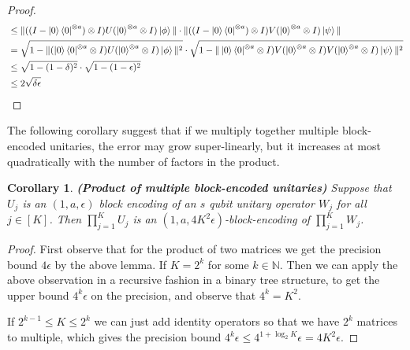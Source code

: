 \documentclass[12pt, oneside]{book}
\newtheorem{corollary}[theorem]{Corollary}
\theoremstyle{definition}
\theoremstyle{definition}
\theoremstyle{remark}
\begin{document}
\begin{proof}
\begin{align*}
    &\leq \|((I-\ket{0}\bra{0}^{\otimes a})\otimes I)U(\ket{0}^{\otimes a}\otimes I)\ket{\phi}\|\cdot \|((I-\ket{0}\bra{0}^{\otimes a})\otimes I)V(\ket{0}^{\otimes a}\otimes I)\ket{\psi}\|\\
    &=\sqrt{1-\|(\ket{0}\bra{0}^{\otimes a}\otimes I)U(\ket{0}^{\otimes a}\otimes I)\ket{\phi}\|^2}\cdot \sqrt{1-\|\ket{0}\bra{0}^{\otimes a}\otimes I)V(\ket{0}^{\otimes a}\otimes I)V(\ket{0}^{\otimes a}\otimes I)\ket{\psi}\|^2}\\
    &\leq \sqrt{1-(1-\delta)^2}\cdot \sqrt{1-(1-\epsilon)^2}\\
    &\leq 2\sqrt{\delta \epsilon}
    \end{align*}
\end{proof}
The following corollary suggest that if we multiply together multiple block-encoded unitaries, the error may grow super-linearly, but it increases at most quadratically with the number of factors in the product.

\begin{corollary}
\textbf{(Product of multiple block-encoded unitaries)} Suppose that $U_j$ is an $(1,a,\epsilon)$ block encoding of an $s$ qubit unitary operator $W_j$ for all $j\in[K]$. Then $\prod_{j=1}^K U_j$ is an $(1,a,4K^2\epsilon)$-block-encoding of $\prod_{j=1}^K W_j$.
\end{corollary}
\begin{proof}
    First observe that for the product of two matrices we get the precision bound $4\epsilon$ by the above lemma. If $K=2^k$ for some $k\in\mathbb{N}$. Then we can apply the above observation in a recursive fashion in a binary tree structure, to get the upper bound $4^k\epsilon$ on the precision, and observe that $4^k=K^2$.

    If $2^{k-1}\leq K\leq 2^k$ we can just add identity operators so that we have $2^k$ matrices to multiple, which gives the precision bound $4^k\epsilon\leq 4^{1+\log_2 K}\epsilon =4K^2\epsilon$.
\end{proof}
\end{document}
